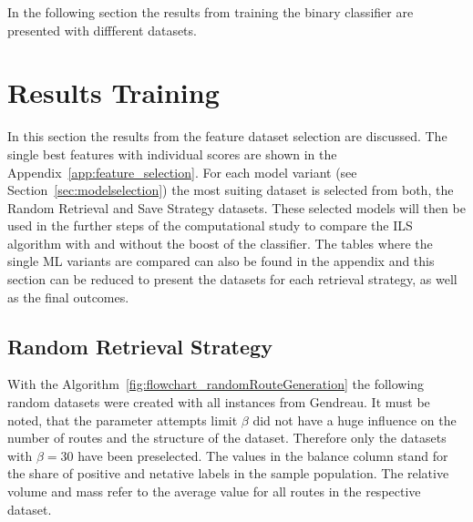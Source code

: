 In the following section the results from training the binary classifier are presented with diffferent datasets.

\section{Results Training}
\label{sec:ResultsTraining}
In this section the results from the feature dataset selection are discussed. The single best features
with individual scores are shown in the Appendix~\ref{app:feature_selection}. For each model variant (see Section~\ref{sec:modelselection})
the most suiting dataset is selected from both, the Random Retrieval and Save Strategy datasets. These selected
models will then be used in the further steps of the computational study to compare the \gls{ILS} algorithm
with and without the boost of the classifier. The tables where the single \gls{ML} variants are compared
can also be found in the appendix and this section can be reduced to present the datasets for each
retrieval strategy, as well as the final outcomes.

\subsection{Random Retrieval Strategy}
With the Algorithm~\ref{fig:flowchart_randomRouteGeneration} the following random datasets were created with all
instances from Gendreau. It must be noted, that the parameter attempts limit $\beta$ did not have a huge influence on
the number of routes and the structure of the dataset. Therefore only the datasets with $\beta = 30$ have been preselected.
The values in the balance column stand for the share of positive and netative labels in the sample population. The relative volume
and mass refer to the average value for all routes in the respective dataset.

